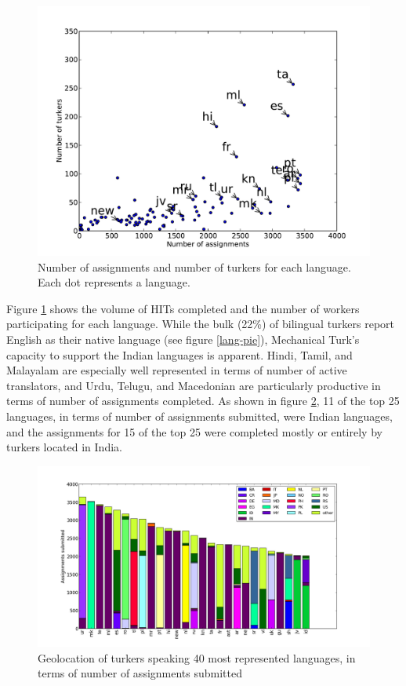 \documentclass[11pt]{article}
\begin{document}
\begin{figure}[h]
\centering
\includegraphics[width=6in]{figures/assign-turk-scatter}
\caption{Number of assignments and number of turkers for each language. Each dot represents a language.}
\label{ass-scatter}
\end{figure}

Figure \ref{ass-scatter} shows the volume of HITs completed and the number of workers participating for each language. While the bulk (22\%) of bilingual turkers report English as their native language (see figure \ref{lang-pie}), Mechanical Turk's capacity to support the Indian languages is apparent. Hindi, Tamil, and Malayalam are especially well represented in terms of number of active translators, and Urdu, Telugu, and Macedonian are particularly productive in terms of number of assignments completed. As shown in figure \ref{langgeo-bar}, 11 of the top 25 languages, in terms of number of assignments submitted, were Indian languages, and the assignments for 15 of the top 25 were completed mostly or entirely by turkers located in India. 

\begin{figure}[h]
\centering
\includegraphics[width=6in]{figures/assign-langgeo-sorted}
\caption{Geolocation of turkers speaking 40 most represented languages, in terms of number of assignments submitted}
\label{langgeo-bar}
\end{figure}
\end{document}
